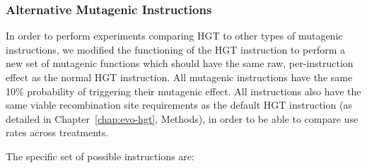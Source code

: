 \documentclass[PhD]{msu-thesis}
\begin{document}
\subsubsection{Alternative Mutagenic Instructions}
In order to perform experiments comparing HGT to other types of mutagenic instructions, we modified the functioning of the HGT instruction to perform a new set of mutagenic functions which should have the same raw, per-instruction effect as the normal HGT instruction.
All mutagenic instructions have the same 10\% probability of triggering their mutagenic effect. All instructions also have the same viable recombination site requirements as the default HGT instruction (as detailed in Chapter~\ref{chap:evo-hgt}, Methods), in order to be able to compare use rates across treatments.

The specific set of possible instructions are:
\end{document}

